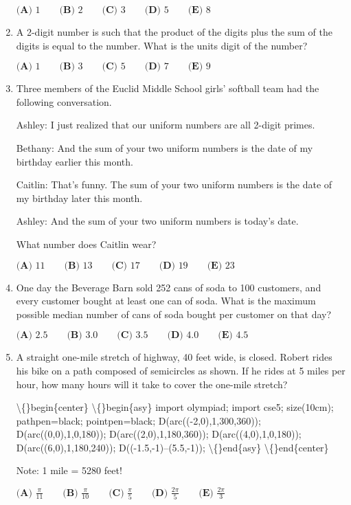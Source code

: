 \documentclass{article}
\begin{document}
\begin{enumerate}[label=\arabic*., itemsep=0.5em]
\( \textbf{(A) }1\qquad\textbf{(B) }2\qquad\textbf{(C) }3\qquad\textbf{(D) }5\qquad\textbf{(E) }8 \)\par \vspace{0.5em}\item A 2-digit number is such that the product of the digits plus the sum of the digits is equal to the number. What is the units digit of the number?

\( \textbf{(A) }1\qquad\textbf{(B) }3\qquad\textbf{(C) }5\qquad\textbf{(D) }7\qquad\textbf{(E) }9 \)\par \vspace{0.5em}\item Three members of the Euclid Middle School girls' softball team had the following conversation.

Ashley: I just realized that our uniform numbers are all 2-digit primes.

Bethany: And the sum of your two uniform numbers is the date of my birthday earlier this month.

Caitlin: That's funny. The sum of your two uniform numbers is the date of my birthday later this month.

Ashley: And the sum of your two uniform numbers is today's date.

What number does Caitlin wear?

\( \textbf{(A) }11\qquad\textbf{(B) }13\qquad\textbf{(C) }17\qquad\textbf{(D) }19\qquad\textbf{(E) }23 \)\par \vspace{0.5em}\item One day the Beverage Barn sold 252 cans of soda to 100 customers, and every customer bought at least one can of soda. What is the maximum possible median number of cans of soda bought per customer on that day?

\(\textbf{(A) }2.5\qquad\textbf{(B) }3.0\qquad\textbf{(C) }3.5\qquad\textbf{(D) }4.0\qquad\textbf{(E) }4.5 \)\par \vspace{0.5em}\item A straight one-mile stretch of highway, 40 feet wide, is closed. Robert rides his bike on a path composed of semicircles as shown. If he rides at 5 miles per hour, how many hours will it take to cover the one-mile stretch?


\textbackslash\{\}begin\{center\}
\textbackslash\{\}begin\{asy\}
import olympiad;
import cse5;
size(10cm); pathpen=black; pointpen=black;
D(arc((-2,0),1,300,360));
D(arc((0,0),1,0,180));
D(arc((2,0),1,180,360));
D(arc((4,0),1,0,180));
D(arc((6,0),1,180,240));
D((-1.5,-1)--(5.5,-1));
\textbackslash\{\}end\{asy\}
\textbackslash\{\}end\{center\}

Note: 1 mile = 5280 feet!

\( \textbf{(A) }\frac{\pi}{11}\qquad\textbf{(B) }\frac{\pi}{10}\qquad\textbf{(C) }\frac{\pi}{5}\qquad\textbf{(D) }\frac{2\pi}{5}\qquad\textbf{(E) }\frac{2\pi}{3} \)\par \vspace{0.5em}\end{enumerate}
\end{document}

